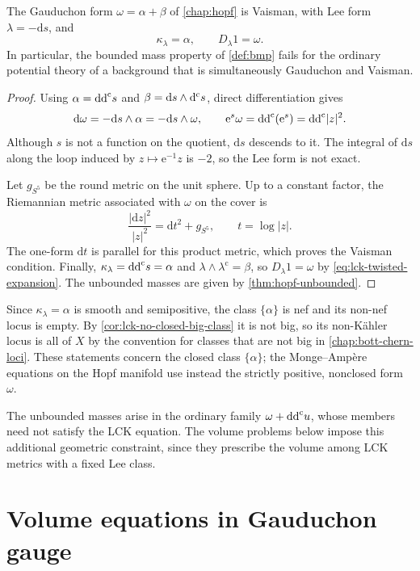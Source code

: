 \begin{proposition}\label{prop:lck-hopf-vaisman}
The Gauduchon form $\omega=\alpha+\beta$ of \cref{chap:hopf} is Vaisman, with Lee form $\lambda=-\mathrm{d}s$, and
\[
 \kappa_\lambda=\alpha,
 \qquad D_\lambda1=\omega.
\]
In particular, the bounded mass property of \cref{def:bmp} fails for the ordinary potential theory of a background that is simultaneously Gauduchon and Vaisman.
\end{proposition}
\begin{proof}
Using $\alpha=\mathrm{dd}^{\mathrm{c}} s$ and $\beta=\mathrm{d}s\wedge\mathrm d^{\mathrm c} s$, direct differentiation gives
\[
 \mathrm{d}\omega=-\mathrm{d}s\wedge\alpha
                   =-\mathrm{d}s\wedge\omega,
 \qquad \mathrm{e}^s\omega=\mathrm{dd}^{\mathrm{c}}(\mathrm{e}^s)=\mathrm{dd}^{\mathrm{c}}|z|^2.
\]
Although $s$ is not a function on the quotient, $\mathrm{d}s$ descends to it. The integral of $\mathrm{d}s$ along the loop induced by $z\mapsto \mathrm{e}^{-1}z$ is $-2$, so the Lee form is not exact.

Let $g_{S^5}$ be the round metric on the unit sphere. Up to a constant factor, the Riemannian metric associated with $\omega$ on the cover is
\[
 \frac{|\mathrm{d}z|^2}{|z|^2}
 =\mathrm{d}t^2+g_{S^5},\qquad t=\log|z|.
\]
The one-form $\mathrm{d}t$ is parallel for this product metric, which proves the Vaisman condition. Finally,
$\kappa_\lambda=\mathrm{dd}^{\mathrm{c}} s=\alpha$ and
$\lambda\wedge\lambda^{\mathrm c}=\beta$, so $D_\lambda1=\omega$ by \eqref{eq:lck-twisted-expansion}.
The unbounded masses are given by \cref{thm:hopf-unbounded}.
\end{proof}

Since $\kappa_\lambda=\alpha$ is smooth and semipositive, the class $\{\alpha\}$ is nef and its non-nef locus is empty. By \cref{cor:lck-no-closed-big-class} it is not big, so its non-K\"ahler locus is all of $X$ by the convention for classes that are not big in \cref{chap:bott-chern-loci}. These statements concern the closed class $\{\alpha\}$; the Monge--Amp\`ere equations on the Hopf manifold use instead the strictly positive, nonclosed form $\omega$.

The unbounded masses arise in the ordinary family $\omega+\mathrm{dd}^{\mathrm{c}} u$, whose members need not satisfy the LCK equation. The volume problems below impose this additional geometric constraint, since they prescribe the volume among LCK metrics with a fixed Lee class.

\section{Volume equations in Gauduchon gauge}
\label{sec:lck-volume-equations}\label{prop:lck-coupled-equation}

